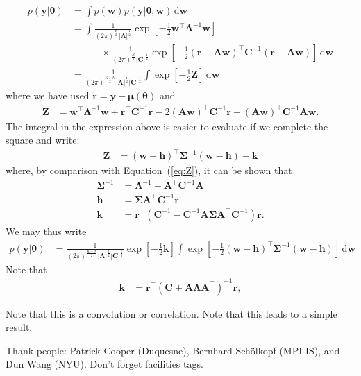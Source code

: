 \documentclass[modern]{rnaastex}
\renewcommand{\eqref}[1]{\ref{eq:#1}}
\newcommand{\Eq}[1]{Equation~(\eqref{#1})}
\newcommand{\eq}[1]{\Eq{#1}}
\newcommand{\eqlabel}[1]{\label{eq:#1}}
\newcommand{\dd}{\ensuremath{\,\mathrm{d}}}
\newcommand{\bvec}[1]{{\ensuremath{\boldsymbol{#1}}}}
\newcommand{\Gaussian}[3]{\ensuremath{\frac{1}{(2\pi)^\frac{#3}{2}|#2|^\frac{1}{2}}
            \exp\left[ -\frac{1}{2}#1^\top #2^{-1} #1 \right]}}
\begin{document}
\begin{align}
\eqlabel{integral}
p(\bvec{y} | \bvec{\theta}) &=
    \int p(\bvec{w}) p(\bvec{y} | \bvec{\theta}, \bvec{w}) \dd\bvec{w}
    \nonumber \\
%
&= \int \Gaussian{\bvec{w}}{\bvec{\Lambda}}{K} \nonumber\\
& \quad\quad\quad \times \Gaussian{(\bvec{r} - \bvec{A}\bvec{w})}{\bvec{C}}{N}
        \dd\bvec{w} \nonumber \\
%
&= \frac{1}{(2\pi)^\frac{K+N}{2}
        |\bvec{\Lambda}|^\frac{1}{2}
        |\bvec{C}|^\frac{1}{2}}
   \int \exp\left[ -\frac{1}{2} \bvec{Z} \right] \dd\bvec{w}
\end{align}
%
where we have used $\bvec{r} = \bvec{y} - \bvec{\mu}(\bvec{\theta})$ and
%
\begin{align}
\eqlabel{Z}
\bvec{Z} &= \bvec{w}^\top\bvec{\Lambda}^{-1}\bvec{w} +
            \bvec{r}^\top\bvec{C}^{-1}\bvec{r} -
            2(\bvec{A}\bvec{w})^\top \bvec{C}^{-1} \bvec{r} +
            (\bvec{A}\bvec{w})^\top \bvec{C}^{-1} \bvec{A}\bvec{w}.
\end{align}
%
The integral in the expression above is easier to evaluate if we
complete the square and write:
%
\begin{align}
\eqlabel{Z_square}
\bvec{Z} &= (\bvec{w} - \bvec{h})^\top \bvec{\Sigma}^{-1}
            (\bvec{w} - \bvec{h}) + \bvec{k}
\end{align}
%
where, by comparison with \eq{Z}, it can be shown that
%
\begin{align}
\bvec{\Sigma}^{-1} &= \bvec{\Lambda}^{-1} +
                      \bvec{A}^\top \bvec{C}^{-1} \bvec{A} \\
%
\bvec{h} &= \bvec{\Sigma}\bvec{A}^\top \bvec{C}^{-1} \bvec{r} \\
%
\bvec{k} &= \bvec{r}^\top
            \left(
            \bvec{C}^{-1} -
            \bvec{C}^{-1} \bvec{A} \bvec{\Sigma} \bvec{A}^\top \bvec{C}^{-1}
            \right) \bvec{r}.
\end{align}
We may thus write
%
\begin{align}
p(\bvec{y} | \bvec{\theta}) &=
        \frac{1}{(2\pi)^\frac{K+N}{2}
        |\bvec{\Lambda}|^\frac{1}{2}
        |\bvec{C}|^\frac{1}{2}}
    \exp
    \left[
        -\frac{1}{2}
        \bvec{k}
    \right]
   \int \exp
        \left[
            -\frac{1}{2}
            (\bvec{w} - \bvec{h})^\top \bvec{\Sigma}^{-1} (\bvec{w} - \bvec{h})
        \right]
     \dd\bvec{w}
\end{align}
%
%
%
Note that
\begin{align}
\bvec{k} &= \bvec{r}^\top
            \left(
            \bvec{C} + \bvec{A}\bvec{\Lambda}\bvec{A}^\top
            \right)^{-1}
            \bvec{r},
\end{align}

Note that this is a convolution or correlation. Note that this leads to a simple result.

\acknowledgements
Thank people:
  Patrick Cooper (Duquesne),
  Bernhard Sch\"olkopf (MPI-IS), and
  Dun Wang (NYU).
Don't forget facilities tags.


\end{document}

